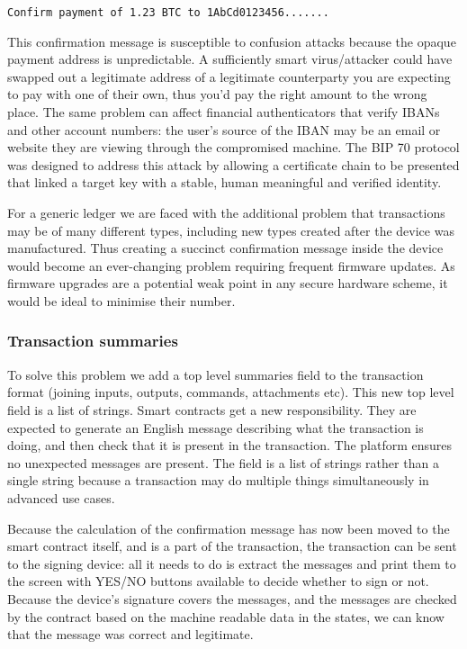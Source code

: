 \documentclass{article}
\begin{document}
\indent\texttt{Confirm payment of 1.23 BTC to 1AbCd0123456.......}

This confirmation message is susceptible to confusion attacks because the opaque payment address is unpredictable.
A sufficiently smart virus/attacker could have swapped out a legitimate address of a legitimate counterparty you
are expecting to pay with one of their own, thus you'd pay the right amount to the wrong place. The same problem
can affect financial authenticators that verify IBANs and other account numbers: the user's source of the IBAN may
be an email or website they are viewing through the compromised machine. The BIP 70\cite{BIP70} protocol was
designed to address this attack by allowing a certificate chain to be presented that linked a target key with a
stable, human meaningful and verified identity.

For a generic ledger we are faced with the additional problem that transactions may be of many different types,
including new types created after the device was manufactured. Thus creating a succinct confirmation message inside
the device would become an ever-changing problem requiring frequent firmware updates. As firmware upgrades are a
potential weak point in any secure hardware scheme, it would be ideal to minimise their number.

\subsubsection{Transaction summaries}

To solve this problem we add a top level summaries field to the transaction format (joining inputs, outputs,
commands, attachments etc). This new top level field is a list of strings. Smart contracts get a new
responsibility. They are expected to generate an English message describing what the transaction is doing, and then
check that it is present in the transaction. The platform ensures no unexpected messages are present. The field is
a list of strings rather than a single string because a transaction may do multiple things simultaneously in
advanced use cases.

Because the calculation of the confirmation message has now been moved to the smart contract itself, and is a part
of the transaction, the transaction can be sent to the signing device: all it needs to do is extract the messages
and print them to the screen with YES/NO buttons available to decide whether to sign or not. Because the device's
signature covers the messages, and the messages are checked by the contract based on the machine readable data in
the states, we can know that the message was correct and legitimate.
\end{document}
